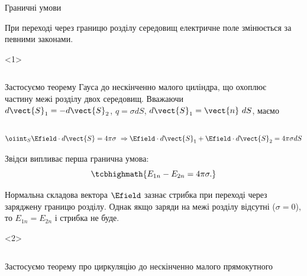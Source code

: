 \documentclass{beamer}
\begin{document}
\begin{frame}{Граничні умови}{}
	\begin{block}{}
		При переході через границю розділу середовищ електричне поле змінюється за
		певними законами.
	\end{block}
	\begin{onlyenv}
		\begin{columns}
			\begin{column}{0.6\linewidth}
				\begin{block}{}\scriptsize\justifying
					Застосуємо теорему Гауса до нескінченно малого циліндра, що охоплює частину межі
					розділу двох
					середовищ. Вважаючи $d\vect{S}_1 = - d\vect{S}_2$, $q = \sigma dS$,
					$d\vect{S}_1 =
						\vect{n}\ dS$,
					маємо
				\end{block}
			\end{column}
			\begin{column}{0.4\linewidth}\centering
				
			\end{column}
		\end{columns}
		\begin{block}{}\scriptsize
			\begin{equation*}
				\oiint_S \Efield\cdot d\vect{S} = 4\pi\sigma\ \Rightarrow  \Efield\cdot
				d\vect{S}_1 +
				\Efield\cdot d\vect{S}_2 = 4\pi\sigma dS
			\end{equation*}
		\end{block}
		\begin{block}{}
			Звідси випливає перша гранична умова:
			\begin{equation*}
				\tcbhighmath{
					E_{1n} - E_{2n} = 4\pi\sigma.
				}
			\end{equation*}
		\end{block}
		\begin{alertblock}{}\justifying\scriptsize
			Нормальна складова вектора $\Efield$ зазнає стрибка при
			переході через заряджену границю розділу. Однак якщо заряди на межі розділу відсутні
			($\sigma =
				0$), то $E_{1n} = E_{2n}$ і стрибка не буде.
		\end{alertblock}
	\end{onlyenv}
	\begin{onlyenv}
		\begin{columns}
			\begin{column}{0.6\linewidth}
				\begin{block}{}\scriptsize\justifying
					Застосуємо теорему про циркуляцію до нескінченно малого прямокутного

\end{block}
\end{column}
\end{columns}
\end{onlyenv}
\end{frame}
\end{document}
